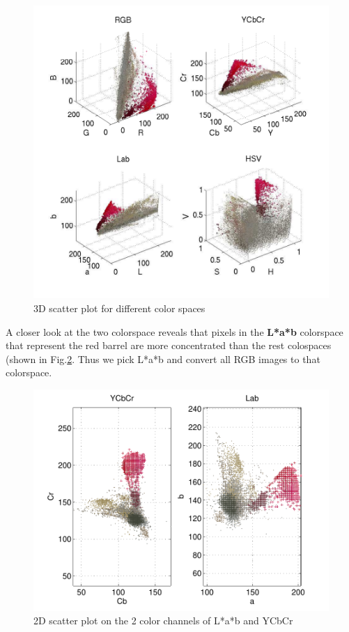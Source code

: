 \documentclass[twoside]{article}
\begin{document}
\begin{multicols}{2}
\begin{figure}[H]
  \centering
  \includegraphics[width=\columnwidth]{cspace.pdf}
    \caption{3D scatter plot for different color spaces}
    \label{fig:cspace}
\end{figure}

A closer look at the two colorspace reveals that pixels in the \textbf{L*a*b} colorspace that represent the red barrel are more concentrated than the rest colospaces (shown in Fig.\ref{fig:cspace_2d}. Thus we pick L*a*b and convert all RGB images to that colorspace.

\begin{figure}[H]
  \centering
  \includegraphics[width=\columnwidth]{cspace_2d.pdf}
    \caption{2D scatter plot on the 2 color channels of L*a*b and YCbCr}
    \label{fig:cspace_2d}
\end{figure}


\end{multicols}
\end{document}

